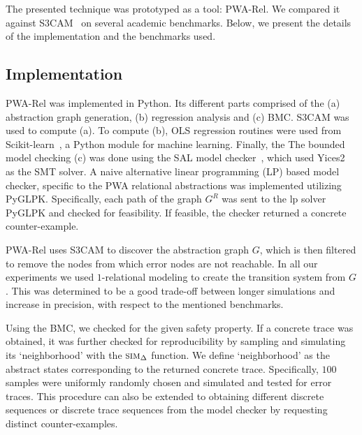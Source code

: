 The presented technique was prototyped as a tool: PWA-Rel.  We
compared it against S3CAM~\cite{zutshi2014multiple} on several
academic benchmarks. Below, we present the details of the
implementation and the benchmarks used.

\subsection{Implementation}
PWA-Rel was implemented in Python. Its different parts comprised of
the (a) abstraction graph generation, (b) regression analysis and (c)
BMC. S3CAM was used to compute (a). To compute (b), OLS regression
routines were used from Scikit-learn~\cite{pedregosa2011scikit}, a
Python module for machine learning. Finally, the The bounded model
checking (c) was done using the SAL model checker~\cite{SAL-SRI},
which used Yices2~\cite{dutertre2014yices} as the SMT solver. A naive
alternative linear programming (LP) based model checker, specific to
the PWA relational abstractions was implemented utilizing PyGLPK.
Specifically, each path of the graph $G^R$ was sent to the lp solver
PyGLPK and checked for feasibility. If feasible, the checker returned
a concrete counter-example.

PWA-Rel uses S3CAM to discover the abstraction graph $G$, which is
then filtered to remove the nodes from which error nodes are not
reachable. In all our experiments we used $1$-relational modeling to
create the transition system from $G$. This was determined to be a
good trade-off between longer simulations and increase in precision,
with respect to the mentioned benchmarks.

Using the BMC, we checked for the given safety property. If a concrete
trace was obtained, it was further checked for reproducibility by
sampling and simulating its `neighborhood' with the $\mbox{\sc sim}_\Delta$
function. We define `neighborhood' as the abstract states
corresponding to the returned concrete trace.  Specifically, $100$
samples were uniformly randomly chosen and simulated and tested for
error traces. This procedure can also be extended to obtaining
different discrete sequences or discrete trace sequences from the
model checker by requesting distinct counter-examples.


